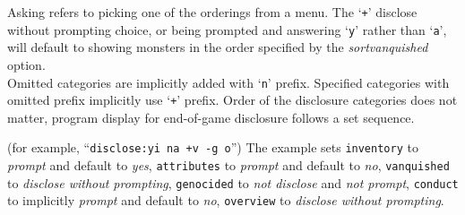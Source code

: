 Asking refers to picking one of the orderings from a menu.
The `{\tt +}' disclose without prompting choice,
or being prompted and answering `{\tt y}' rather than `{\tt a}',
will default to showing monsters in the order specified by the
{\it sortvanquished\/} option.
\\
Omitted categories are implicitly added with `{\tt n}' prefix.
Specified categories with omitted prefix implicitly use `{\tt +}' prefix.
Order of the disclosure categories does not matter, program display for
end-of-game disclosure follows a set sequence.

(for example, ``{\tt disclose:yi na +v -g o}'')
The example sets
{\tt inventory} to {\it prompt\/} and default to {\it yes\/},
{\tt attributes} to {\it prompt\/} and default to {\it no\/},
{\tt vanquished} to {\it disclose without prompting\/},
{\tt genocided} to {\it not disclose\/} and {\it not prompt\/},
{\tt conduct} to implicitly {\it prompt\/} and default to {\it no\/},
{\tt overview} to {\it disclose without prompting\/}.

